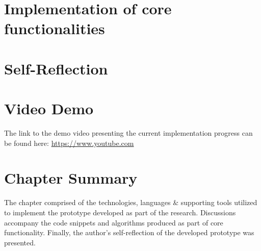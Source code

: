 \section{Implementation of core functionalities}

\section{Self-Reflection}


\section{Video Demo}
The link to the demo video presenting the current implementation progress can be found here: \url{https://www.youtube.com}

\section{Chapter Summary}
The chapter comprised of the technologies, languages \& supporting tools utilized to implement the prototype developed as part of the research. Discussions accompany the code snippets and algorithms produced as part of core functionality. Finally, the author's self-reflection of the developed prototype was presented.
